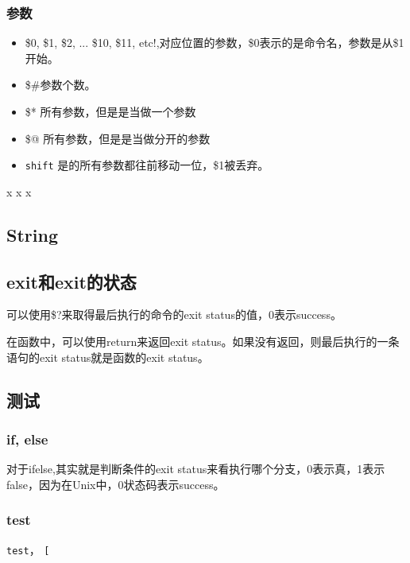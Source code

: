 \subsubsection{参数}

\begin{itemize}
\item \$0, \$1, \$2, ... \${10}, \${11}, etc!,对应位置的参数，\$0表示的是命令名，参数是从\$1开始。
\item \$\#参数个数。
\item \$* 所有参数，但是是当做一个参数
\item \$@ 所有参数，但是是当做分开的参数
\item \lstinline$shift$ 是的所有参数都往前移动一位，\$1被丢弃。
\end{itemize}

\begin{Command-Line}[\$*和\$@的区别]
x
x
x
\end{Command-Line}

\subsection{String}

\subsection{exit和exit的状态}

可以使用\$?来取得最后执行的命令的exit status的值，0表示success。


在函数中，可以使用return来返回exit status。如果没有返回，则最后执行的一条语句的exit status就是函数的exit status。

\subsection{测试}

\subsubsection{if, else}

对于ifelse,其实就是判断条件的exit status来看执行哪个分支，0表示真，1表示false，因为在Unix中，0状态码表示success。

\subsubsection{test}

\lstinline$test$， \lstinline$[$

